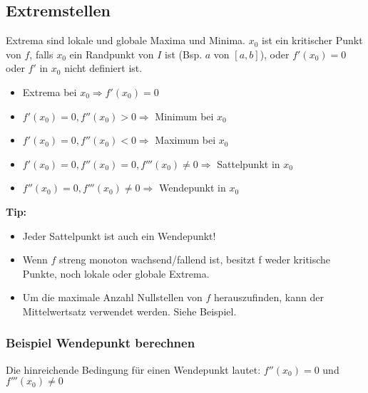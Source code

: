 

\subsection{Extremstellen}
Extrema sind lokale und globale Maxima und Minima. $x_0$ ist ein kritischer Punkt von $f$, falls $x_0$ ein Randpunkt von $I$ ist (Bsp. $a$ von $[a, b]$), oder $f'(x_0) = 0$ oder $f'$ in $x_0$ nicht definiert ist.
\begin{itemize}
	\item Extrema bei $x_0 \Rightarrow f'(x_0) = 0$
	\item $f'(x_0) = 0, f''(x_0) > 0 \Rightarrow$ Minimum bei $x_0$
	\item $f'(x_0) = 0, f''(x_0) < 0 \Rightarrow$ Maximum bei $x_0$
	\item $f'(x_0) = 0, f''(x_0) = 0, f'''(x_0) \neq 0 \Rightarrow$ Sattelpunkt in $x_0$
	\item \hspace{1.6cm} $f''(x_0) = 0, f'''(x_0) \neq 0 \Rightarrow$ Wendepunkt in $x_0$
\end{itemize}
\textbf{Tip:}
\begin{itemize}
	\item Jeder Sattelpunkt ist auch ein Wendepunkt!
	\item Wenn $f$ streng monoton wachsend/fallend ist, besitzt f weder kritische Punkte, noch lokale oder globale Extrema.
	\item Um die maximale Anzahl Nullstellen von $f$ herauszufinden, kann der Mittelwertsatz verwendet werden. Siehe Beispiel.
\end{itemize}


\subsubsection[Bsp. Wendepunkt]{Beispiel Wendepunkt berechnen}
Die hinreichende Bedingung für einen Wendepunkt lautet: $f''(x_0) = 0$ und $f'''(x_0) \not= 0$\\
 
